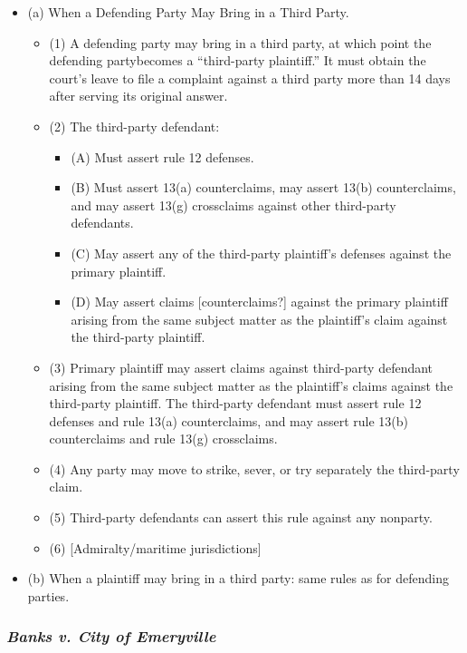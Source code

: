 \begin{itemize}
    \item (a) When a Defending Party May Bring in a Third Party.
    \begin{itemize}
        \item (1) A defending party may bring in a third party, at which point 
        the defending partybecomes a ``third-party plaintiff.'' It must obtain 
        the court's leave to file a complaint against a third party more than 
        14 days after serving its original answer.
        \item (2) The third-party defendant:
        \begin{itemize}
            \item (A) Must assert rule 12 defenses.
            \item (B) Must assert 13(a) counterclaims, may assert 13(b) 
            counterclaims, and may assert 13(g) crossclaims against other 
            third-party defendants.
            \item (C) May assert any of the third-party plaintiff's defenses 
            against the primary plaintiff.
            \item (D) May assert claims [counterclaims?] against the primary 
            plaintiff arising from the same subject matter as the plaintiff's 
            claim against the third-party plaintiff.
        \end{itemize}
        \item (3) Primary plaintiff may assert claims against third-party 
        defendant arising from the same subject matter as the plaintiff's 
        claims against the third-party plaintiff. The third-party defendant 
        must assert rule 12 defenses and rule 13(a) counterclaims, and may 
        assert rule 13(b) counterclaims and rule 13(g) crossclaims.
        \item (4) Any party may move to strike, sever, or try separately the 
        third-party claim.
        \item (5) Third-party defendants can assert this rule against any 
        nonparty.
        \item (6) [Admiralty/maritime jurisdictions]
    \end{itemize}
    \item (b) When a plaintiff may bring in a third party: same rules as for 
    defending parties.
\end{itemize}

\subsubsection{\emph{Banks v. City of Emeryville}}

